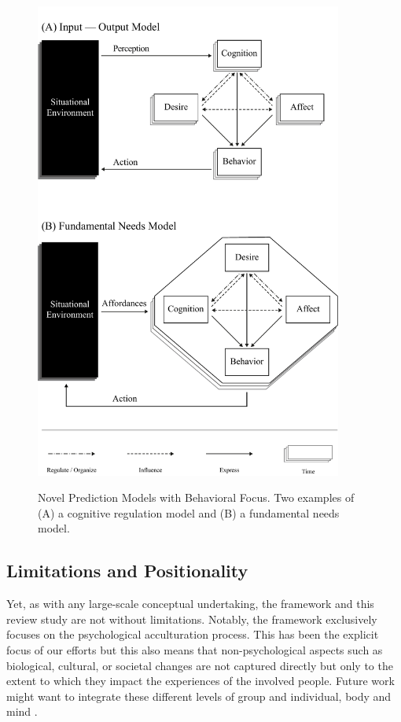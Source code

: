 \documentclass[man, 12pt, a4paper, mask]{apa7}
\begin{document}


\begin{figure}[ht!]
\centering
    \caption{Novel Prediction Models with Behavioral Focus. Two examples of (A) a cognitive regulation model and (B) a fundamental needs model.}
\includegraphics[width=0.9\textwidth]{Figures/NovelPredictionsBehaviorTime.pdf}
\label{fig:NovelModels}
\end{figure}

\subsection{Limitations and Positionality}
Yet, as with any large-scale conceptual undertaking, the framework and this review study are not without limitations. Notably, the framework exclusively focuses on the psychological acculturation process. This has been the explicit focus of our efforts but this also means that non-psychological aspects such as biological, cultural, or societal changes are not captured directly but only to the extent to which they impact the experiences of the involved people. Future work might want to integrate these different levels of group and individual, body and mind \citep[e.g.,][]{Eronen2021}. 
\end{document}
